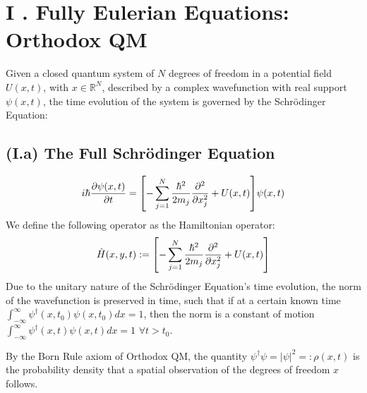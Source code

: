 \documentclass[11pt, a4paper]{article} %
\newcommand{\R}{\mathbb{R}} %
\begin{document}
\section*{I . Fully Eulerian Equations: Orthodox QM }
Given a closed quantum system of $N$ degrees of freedom in a potential field $U(x, t)$, with $x\in\R^N$, described by a complex wavefunction with real support $\psi(x,t)$, the time evolution of the system is governed by the Schrödinger Equation:

\subsection*{(I.a) The Full Schrödinger Equation}
\begin{equation}\label{SE}
i\hbar \pdv{\psi(x,t)}{t} = \qty[-\sum_{j=1}^N\frac{\hbar^2}{2m_j}\pdv[2]{}{x_j} + U(x,t)]\psi(x,t)
\end{equation}
We define the following operator as the Hamiltonian operator:
\begin{equation}
\hat{H}(x, y, t):=\qty[-\sum_{j=1}^N\frac{\hbar^2}{2m_j}\pdv[2]{}{x_j} + U(x,t)]
\end{equation}
Due to the unitary nature of the Schrödinger Equation's time evolution, the norm of the wavefunction is preserved in time, such that if at a certain known time $\int^\infty_{-\infty} \psi^\dagger(x,t_0)\psi(x,t_0)dx=1$, then the norm is a constant of motion $\int^\infty_{-\infty} \psi^\dagger(x,t)\psi(x,t)dx=1$ $\forall t>t_0$.

By the Born Rule axiom of Orthodox QM, the quantity $\psi^\dagger\psi=|\psi|^2=:\rho(x,t)$ is the probability density that a spatial observation of the degrees of freedom $x$ follows.
\end{document}
